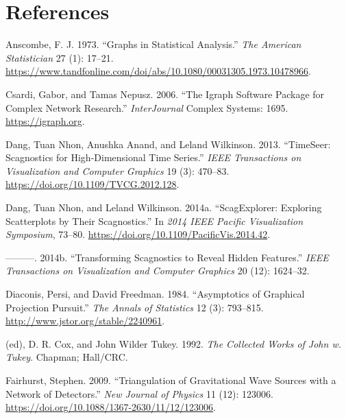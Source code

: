 \hypertarget{references}{%
\section*{References}\label{references}}

\hypertarget{refs}{}
\begin{CSLReferences}{1}{0}
\leavevmode{}%
Anscombe, F. J. 1973. {``Graphs in Statistical Analysis.''} \emph{The American Statistician} 27 (1): 17--21. \url{https://www.tandfonline.com/doi/abs/10.1080/00031305.1973.10478966}.

\leavevmode{}%
Csardi, Gabor, and Tamas Nepusz. 2006. {``The Igraph Software Package for Complex Network Research.''} \emph{InterJournal} Complex Systems: 1695. \url{https://igraph.org}.

\leavevmode{}%
Dang, Tuan Nhon, Anushka Anand, and Leland Wilkinson. 2013. {``TimeSeer: Scagnostics for High-Dimensional Time Series.''} \emph{IEEE Transactions on Visualization and Computer Graphics} 19 (3): 470--83. \url{https://doi.org/10.1109/TVCG.2012.128}.

\leavevmode{}%
Dang, Tuan Nhon, and Leland Wilkinson. 2014a. {``ScagExplorer: Exploring Scatterplots by Their Scagnostics.''} In \emph{2014 IEEE Pacific Visualization Symposium}, 73--80. \url{https://doi.org/10.1109/PacificVis.2014.42}.

\leavevmode{}%
---------. 2014b. {``Transforming Scagnostics to Reveal Hidden Features.''} \emph{IEEE Transactions on Visualization and Computer Graphics} 20 (12): 1624--32.

\leavevmode{}%
Diaconis, Persi, and David Freedman. 1984. {``Asymptotics of Graphical Projection Pursuit.''} \emph{The Annals of Statistics} 12 (3): 793--815. \url{http://www.jstor.org/stable/2240961}.

\leavevmode{}%
(ed), D. R. Cox, and John Wilder Tukey. 1992. \emph{The Collected Works of John w. Tukey}. Chapman; Hall/CRC.

\leavevmode{}%
Fairhurst, Stephen. 2009. {``Triangulation of Gravitational Wave Sources with a Network of Detectors.''} \emph{New Journal of Physics} 11 (12): 123006. \url{https://doi.org/10.1088/1367-2630/11/12/123006}.


\end{CSLReferences}
